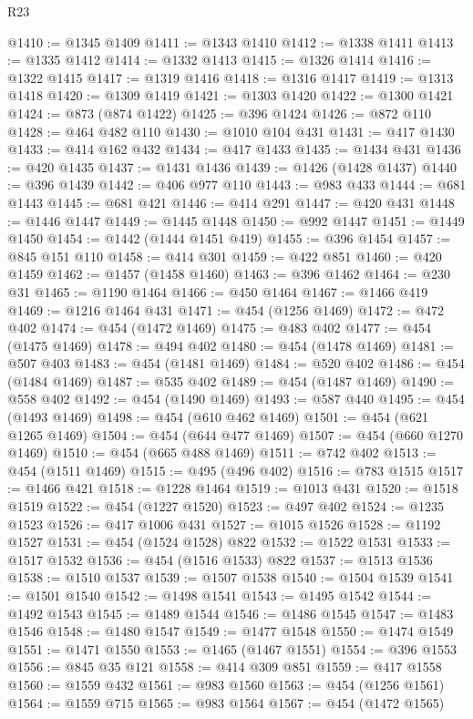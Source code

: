 \begin{lexlean}{R23}
\begin{coremodule}
{{{{{{{{{{{{{{{{{{{{{{{{{{{{{{{{{{{{{{{{{{{{{{{{{{{{{{{{{{{{{{{{{{{{{{{{{{{{{{{{{{{{{{{{{{{{{@1410 := @1345 @1409
@1411 := @1343 @1410
@1412 := @1338 @1411
@1413 := @1335 @1412
@1414 := @1332 @1413
@1415 := @1326 @1414
@1416 := @1322 @1415
@1417 := @1319 @1416
@1418 := @1316 @1417
@1419 := @1313 @1418
@1420 := @1309 @1419
@1421 := @1303 @1420
@1422 := @1300 @1421
@1424 := @873 (@874 @1422)
@1425 := @396 @1424
@1426 := @872 @110
@1428 := @464 @482 @110
@1430 := @1010 @104 @431
@1431 := @417 @1430
@1433 := @414 @162 @432
@1434 := @417 @1433
@1435 := @1434 @431
@1436 := @420 @1435
@1437 := @1431 @1436
@1439 := @1426 (@1428 @1437)
@1440 := @396 @1439
@1442 := @406 @977 @110
@1443 := @983 @433
@1444 := @681 @1443
@1445 := @681 @421
@1446 := @414 @291
@1447 := @420 @431
@1448 := @1446 @1447
@1449 := @1445 @1448
@1450 := @992 @1447
@1451 := @1449 @1450
@1454 := @1442 (@1444 @1451 @419)
@1455 := @396 @1454
@1457 := @845 @151 @110
@1458 := @414 @301
@1459 := @422 @851
@1460 := @420 @1459
@1462 := @1457 (@1458 @1460)
@1463 := @396 @1462
@1464 := @230 @31
@1465 := @1190 @1464
@1466 := @450 @1464
@1467 := @1466 @419
@1469 := @1216 @1464 @431
@1471 := @454 (@1256 @1469)
@1472 := @472 @402
@1474 := @454 (@1472 @1469)
@1475 := @483 @402
@1477 := @454 (@1475 @1469)
@1478 := @494 @402
@1480 := @454 (@1478 @1469)
@1481 := @507 @403
@1483 := @454 (@1481 @1469)
@1484 := @520 @402
@1486 := @454 (@1484 @1469)
@1487 := @535 @402
@1489 := @454 (@1487 @1469)
@1490 := @558 @402
@1492 := @454 (@1490 @1469)
@1493 := @587 @440
@1495 := @454 (@1493 @1469)
@1498 := @454 (@610 @462 @1469)
@1501 := @454 (@621 @1265 @1469)
@1504 := @454 (@644 @477 @1469)
@1507 := @454 (@660 @1270 @1469)
@1510 := @454 (@665 @488 @1469)
@1511 := @742 @402
@1513 := @454 (@1511 @1469)
@1515 := @495 (@496 @402)
@1516 := @783 @1515
@1517 := @1466 @421
@1518 := @1228 @1464
@1519 := @1013 @431
@1520 := @1518 @1519
@1522 := @454 (@1227 @1520)
@1523 := @497 @402
@1524 := @1235 @1523
@1526 := @417 @1006 @431
@1527 := @1015 @1526
@1528 := @1192 @1527
@1531 := @454 (@1524 @1528) @822
@1532 := @1522 @1531
@1533 := @1517 @1532
@1536 := @454 (@1516 @1533) @822
@1537 := @1513 @1536
@1538 := @1510 @1537
@1539 := @1507 @1538
@1540 := @1504 @1539
@1541 := @1501 @1540
@1542 := @1498 @1541
@1543 := @1495 @1542
@1544 := @1492 @1543
@1545 := @1489 @1544
@1546 := @1486 @1545
@1547 := @1483 @1546
@1548 := @1480 @1547
@1549 := @1477 @1548
@1550 := @1474 @1549
@1551 := @1471 @1550
@1553 := @1465 (@1467 @1551)
@1554 := @396 @1553
@1556 := @845 @35 @121
@1558 := @414 @309 @851
@1559 := @417 @1558
@1560 := @1559 @432
@1561 := @983 @1560
@1563 := @454 (@1256 @1561)
@1564 := @1559 @715
@1565 := @983 @1564
@1567 := @454 (@1472 @1565)
}}}}}}}}}}}}}}}}}}}}}}}}}}}}}}}}}}}}}}}}}}}}}}}}}}}}}}}}}}}}}}}}}}}}}}}}}}}}}}}}}}}}}}}}}}}}}
\end{coremodule}
\end{lexlean}
